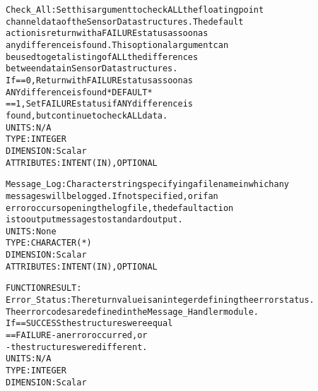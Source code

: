 \begin{alltt}
        Check_All:         Set this argument to check ALL the floating point
                           channel data of the SensorData structures. The default
                           action is return with a FAILURE status as soon as
                           any difference is found. This optional argument can
                           be used to get a listing of ALL the differences
                           between data in SensorData structures.
                           If == 0, Return with FAILURE status as soon as
                                    ANY difference is found  *DEFAULT*
                              == 1, Set FAILURE status if ANY difference is
                                    found, but continue to check ALL data.
                           UNITS:      N/A
                           TYPE:       INTEGER
                           DIMENSION:  Scalar
                           ATTRIBUTES: INTENT(IN), OPTIONAL
 
        Message_Log:       Character string specifying a filename in which any
                           messages will be logged. If not specified, or if an
                           error occurs opening the log file, the default action
                           is to output messages to standard output.
                           UNITS:      None
                           TYPE:       CHARACTER(*)
                           DIMENSION:  Scalar
                           ATTRIBUTES: INTENT(IN), OPTIONAL
 
  FUNCTION RESULT:
        Error_Status:      The return value is an integer defining the error status.
                           The error codes are defined in the Message_Handler module.
                           If == SUCCESS the structures were equal
                              == FAILURE - an error occurred, or
                                         - the structures were different.
                           UNITS:      N/A
                           TYPE:       INTEGER
                           DIMENSION:  Scalar
 
  \end{alltt}
